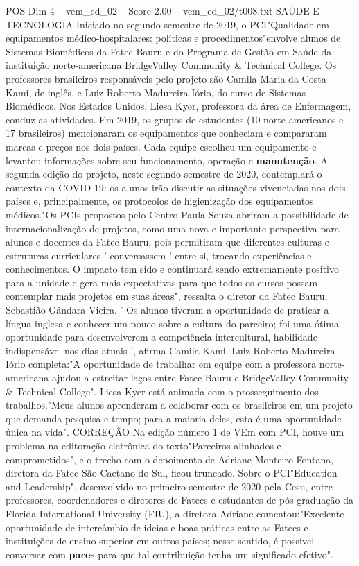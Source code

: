 \begin{textsample}{POS Dim 4 – vem\_ed\_02 – Score 2.00 – vem\_ed\_02/t008.txt}  \label{ex:f4_pos_026}
SAÚDE E TECNOLOGIA Iniciado no segundo semestre de 2019, o PCI"Qualidade em equipamentos médico-hospitalares: políticas e procedimentos"envolve alunos de Sistemas Biomédicos da Fatec Bauru e do Programa de Gestão em Saúde da instituição norte-americana BridgeValley Community \& Technical College.
Os professores brasileiros responsáveis pelo projeto são Camila Maria da Costa Kami, de inglês, e Luiz Roberto Madureira Iório, do curso de Sistemas Biomédicos.
Nos Estados Unidos, Liesa Kyer, professora da área de Enfermagem, conduz as atividades.
Em 2019, os grupos de estudantes (10 norte-americanos e 17 brasileiros) mencionaram os equipamentos que conheciam e compararam marcas e preços nos dois países.
Cada equipe escolheu um equipamento e levantou informações sobre seu funcionamento, operação e \textbf{manutenção}.
A segunda edição do projeto, neste segundo semestre de 2020, contemplará o contexto da COVID-19: os alunos irão discutir as situações vivenciadas nos dois países e, principalmente, os protocolos de higienização dos equipamentos médicos."Os PCIs propostos pelo Centro Paula Souza abriram a possibilidade de internacionalização de projetos, como uma nova e importante perspectiva para alunos e docentes da Fatec Bauru, pois permitiram que diferentes culturas e estruturas curriculares ' conversassem ' entre si, trocando experiências e conhecimentos.
O impacto tem sido e continuará sendo extremamente positivo para a unidade e gera mais expectativas para que todos os cursos possam contemplar mais projetos em suas áreas", ressalta o diretor da Fatec Bauru, Sebastião Gândara Vieira. ' Os alunos tiveram a oportunidade de praticar a língua inglesa e conhecer um pouco sobre a cultura do parceiro; foi uma ótima oportunidade para desenvolverem a competência intercultural, habilidade indispensável nos dias atuais ', afirma Camila Kami.
Luiz Roberto Madureira Iório completa:"A oportunidade de trabalhar em equipe com a professora norte-americana ajudou a estreitar laços entre Fatec Bauru e BridgeValley Community \& Technical College".
Liesa Kyer está animada com o prosseguimento dos trabalhos."Meus alunos aprenderam a colaborar com os brasileiros em um projeto que demanda pesquisa e tempo; para a maioria deles, esta é uma oportunidade única na vida".
CORREÇÃO Na edição número 1 de VEm com PCI, houve um problema na editoração eletrônica do texto"Parceiros alinhados e comprometidos", e o trecho com o depoimento de Adriane Monteiro Fontana, diretora da Fatec São Caetano do Sul, ficou truncado.
Sobre o PCI"Education and Leadership", desenvolvido no primeiro semestre de 2020 pela Cesu, entre professores, coordenadores e diretores de Fatecs e estudantes de pós-graduação da Florida International University (FIU), a diretora Adriane comentou:"Excelente oportunidade de intercâmbio de ideias e boas práticas entre as Fatecs e instituições de ensino superior em outros países; nesse sentido, é possível conversar com \textbf{pares} para que tal contribuição tenha um significado efetivo".

\end{textsample}

